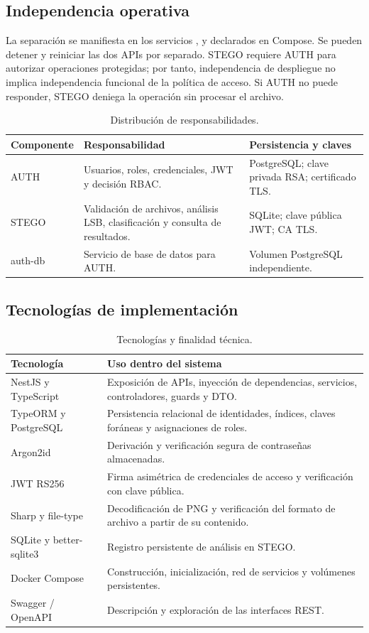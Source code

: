 \documentclass[11pt,a4paper,oneside]{article}
\newcommand{\code}[1]{{\footnotesize\texttt{\detokenize{#1}}}}
\begin{document}
\subsection{Independencia operativa}
La separación se manifiesta en los servicios \code{auth}, \code{stego} y \code{auth-db} declarados en Compose. Se pueden detener y reiniciar las dos APIs por separado. STEGO requiere AUTH para autorizar operaciones protegidas; por tanto, independencia de despliegue no implica independencia funcional de la política de acceso. Si AUTH no puede responder, STEGO deniega la operación sin procesar el archivo.

\begin{table}[H]
\centering\small
\caption{Distribución de responsabilidades.}
\begin{tabularx}{\textwidth}{@{}P{2.4cm}Y Y@{}}
\toprule
\textbf{Componente} & \textbf{Responsabilidad} & \textbf{Persistencia y claves} \\ \midrule
AUTH & Usuarios, roles, credenciales, JWT y decisión RBAC. & PostgreSQL; clave privada RSA; certificado TLS. \\
STEGO & Validación de archivos, análisis LSB, clasificación y consulta de resultados. & SQLite; clave pública JWT; CA TLS. \\
auth-db & Servicio de base de datos para AUTH. & Volumen PostgreSQL independiente. \\
\bottomrule
\end{tabularx}
\end{table}

\subsection{Tecnologías de implementación}
\begin{table}[H]
\centering\small
\caption{Tecnologías y finalidad técnica.}
\begin{tabularx}{\textwidth}{@{}P{3.5cm}Y@{}}\toprule
\textbf{Tecnología} & \textbf{Uso dentro del sistema}\\\midrule
NestJS y TypeScript & Exposición de APIs, inyección de dependencias, servicios, controladores, guards y DTO.\\
TypeORM y PostgreSQL & Persistencia relacional de identidades, índices, claves foráneas y asignaciones de roles.\\
Argon2id & Derivación y verificación segura de contraseñas almacenadas.\\
JWT RS256 & Firma asimétrica de credenciales de acceso y verificación con clave pública.\\
Sharp y file-type & Decodificación de PNG y verificación del formato de archivo a partir de su contenido.\\
SQLite y better-sqlite3 & Registro persistente de análisis en STEGO.\\
Docker Compose & Construcción, inicialización, red de servicios y volúmenes persistentes.\\
Swagger / OpenAPI & Descripción y exploración de las interfaces REST.\\
\bottomrule\end{tabularx}
\end{table}
\end{document}
